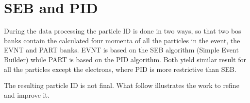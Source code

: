 \section{SEB and PID}
\label{sec:seb_pid}

During the data processing the particle ID is done in two ways, so that two bos banks contain
the calculated four momenta of all the particles in the event,
the EVNT and PART banks. EVNT is based on the SEB 
algorithm (Simple Event Builder) while PART is based on 
the PID algorithm. Both yield similar result for 
all the particles except the electrons, where PID 
is more restrictive than SEB. 

The resulting particle ID is not final. What follow illustrates the work
to refine and improve it. 











